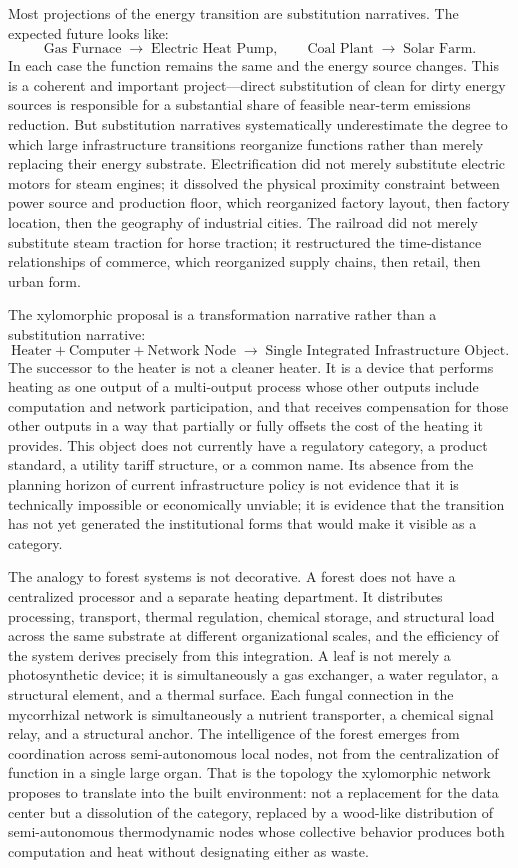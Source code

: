 \documentclass[12pt, oneside]{article}
\begin{document}
Most projections of the energy transition are substitution narratives. The expected future looks like:
\[
\text{Gas Furnace} \;\rightarrow\; \text{Electric Heat Pump}, \qquad \text{Coal Plant} \;\rightarrow\; \text{Solar Farm}.
\]
In each case the function remains the same and the energy source changes. This is a coherent and important project---direct substitution of clean for dirty energy sources is responsible for a substantial share of feasible near-term emissions reduction. But substitution narratives systematically underestimate the degree to which large infrastructure transitions reorganize functions rather than merely replacing their energy substrate. Electrification did not merely substitute electric motors for steam engines; it dissolved the physical proximity constraint between power source and production floor, which reorganized factory layout, then factory location, then the geography of industrial cities. The railroad did not merely substitute steam traction for horse traction; it restructured the time-distance relationships of commerce, which reorganized supply chains, then retail, then urban form.

The xylomorphic proposal is a transformation narrative rather than a substitution narrative:
\[
\text{Heater} + \text{Computer} + \text{Network Node} \;\rightarrow\; \text{Single Integrated Infrastructure Object}.
\]
The successor to the heater is not a cleaner heater. It is a device that performs heating as one output of a multi-output process whose other outputs include computation and network participation, and that receives compensation for those other outputs in a way that partially or fully offsets the cost of the heating it provides. This object does not currently have a regulatory category, a product standard, a utility tariff structure, or a common name. Its absence from the planning horizon of current infrastructure policy is not evidence that it is technically impossible or economically unviable; it is evidence that the transition has not yet generated the institutional forms that would make it visible as a category.

The analogy to forest systems is not decorative. A forest does not have a centralized processor and a separate heating department. It distributes processing, transport, thermal regulation, chemical storage, and structural load across the same substrate at different organizational scales, and the efficiency of the system derives precisely from this integration. A leaf is not merely a photosynthetic device; it is simultaneously a gas exchanger, a water regulator, a structural element, and a thermal surface. Each fungal connection in the mycorrhizal network is simultaneously a nutrient transporter, a chemical signal relay, and a structural anchor. The intelligence of the forest emerges from coordination across semi-autonomous local nodes, not from the centralization of function in a single large organ. That is the topology the xylomorphic network proposes to translate into the built environment: not a replacement for the data center but a dissolution of the category, replaced by a wood-like distribution of semi-autonomous thermodynamic nodes whose collective behavior produces both computation and heat without designating either as waste.
\end{document}
